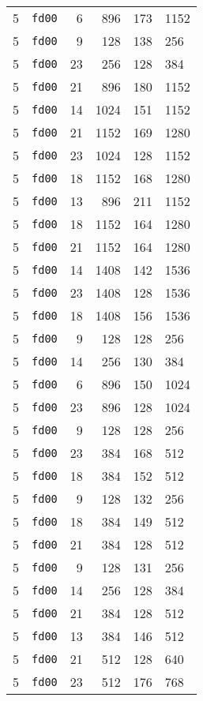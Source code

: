 \documentclass{article}
\begin{document}
\begin{table}[h!]
\begin{tabular}{llrrrl}
    5 & \texttt{fd00} & 6 & 896 & 173 & 1152 \\
    5 & \texttt{fd00} & 9 & 128 & 138 & 256 \\
    5 & \texttt{fd00} & 23 & 256 & 128 & 384 \\
    5 & \texttt{fd00} & 21 & 896 & 180 & 1152 \\
    5 & \texttt{fd00} & 14 & 1024 & 151 & 1152 \\
    5 & \texttt{fd00} & 21 & 1152 & 169 & 1280 \\
    5 & \texttt{fd00} & 23 & 1024 & 128 & 1152 \\
    5 & \texttt{fd00} & 18 & 1152 & 168 & 1280 \\
    5 & \texttt{fd00} & 13 & 896 & 211 & 1152 \\
    5 & \texttt{fd00} & 18 & 1152 & 164 & 1280 \\
    5 & \texttt{fd00} & 21 & 1152 & 164 & 1280 \\
    5 & \texttt{fd00} & 14 & 1408 & 142 & 1536 \\
    5 & \texttt{fd00} & 23 & 1408 & 128 & 1536 \\
    5 & \texttt{fd00} & 18 & 1408 & 156 & 1536 \\
    5 & \texttt{fd00} & 9 & 128 & 128 & 256 \\
    5 & \texttt{fd00} & 14 & 256 & 130 & 384 \\
    5 & \texttt{fd00} & 6 & 896 & 150 & 1024 \\
    5 & \texttt{fd00} & 23 & 896 & 128 & 1024 \\
    5 & \texttt{fd00} & 9 & 128 & 128 & 256 \\
    5 & \texttt{fd00} & 23 & 384 & 168 & 512 \\
    5 & \texttt{fd00} & 18 & 384 & 152 & 512 \\
    5 & \texttt{fd00} & 9 & 128 & 132 & 256 \\
    5 & \texttt{fd00} & 18 & 384 & 149 & 512 \\
    5 & \texttt{fd00} & 21 & 384 & 128 & 512 \\
    5 & \texttt{fd00} & 9 & 128 & 131 & 256 \\
    5 & \texttt{fd00} & 14 & 256 & 128 & 384 \\
    5 & \texttt{fd00} & 21 & 384 & 128 & 512 \\
    5 & \texttt{fd00} & 13 & 384 & 146 & 512 \\
    5 & \texttt{fd00} & 21 & 512 & 128 & 640 \\
    5 & \texttt{fd00} & 23 & 512 & 176 & 768 \\

\end{tabular}
\end{table}
\end{document}
